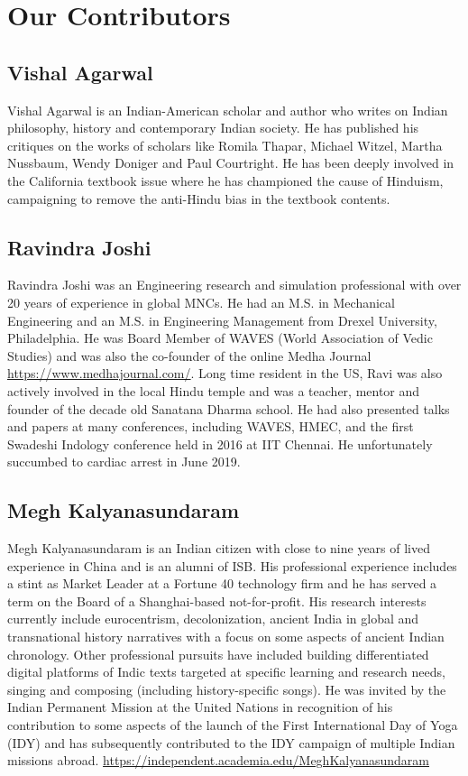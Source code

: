 
\chapter*{Our Contributors }\label{contributors}

\section*{Vishal Agarwal}

Vishal Agarwal is an Indian-American scholar and author who writes on Indian philosophy, history and contemporary Indian society. He has published his critiques on the works of scholars like Romila Thapar, Michael Witzel, Martha Nussbaum, Wendy Doniger and Paul Courtright. He has been deeply involved in the California textbook issue where he has championed the cause of Hinduism, campaigning to remove the anti-Hindu bias in the textbook contents.


\section*{Ravindra Joshi}

Ravindra Joshi was an Engineering research and simulation professional with over 20 years of experience in global MNCs. He had an M.S. in Mechanical Engineering and an M.S. in Engineering Management from Drexel University, Philadelphia. He was Board Member of WAVES (World Association of Vedic Studies) and was also the co-founder of the online Medha Journal \url{https://www.medhajournal.com/}. Long time resident in the US, Ravi was also actively involved in the local Hindu temple and was a teacher, mentor and founder of the decade old Sanatana Dharma school. He had also presented talks and papers at many conferences, including WAVES, HMEC, and the first Swadeshi Indology conference held in 2016 at IIT Chennai. He unfortunately succumbed to cardiac arrest in June 2019.


\section*{Megh Kalyanasundaram}

Megh Kalyanasundaram is an Indian citizen with close to nine years of lived experience in China and is an alumni of ISB. His professional experience includes a stint as Market Leader at a Fortune 40 technology firm and he has served a term on the Board of a Shanghai-based not-for-profit. His research interests currently include eurocentrism, decolonization, ancient India in global and transnational history narratives with a focus on some aspects of ancient Indian chronology. Other professional pursuits have included building differentiated digital platforms of Indic texts targeted at specific learning and research needs, singing and composing (including history-specific songs). He was invited by the Indian Permanent Mission at the United Nations in recognition of his contribution to some aspects of the launch of the First International Day of Yoga (IDY) and has subsequently contributed to the IDY campaign of multiple Indian missions abroad. \url{https://independent.academia.edu/MeghKalyanasundaram}


